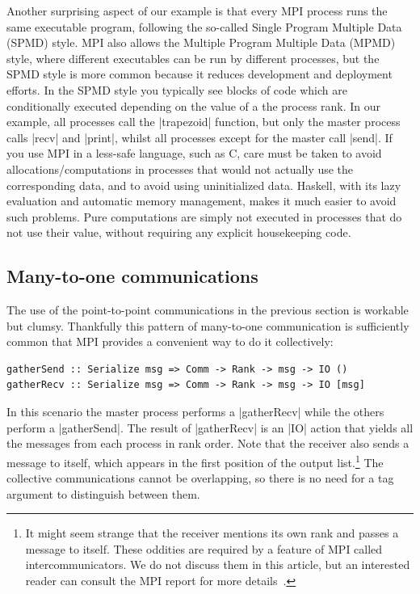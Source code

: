 \documentclass{tmr}
\begin{document}
Another surprising aspect of our example is that every MPI process
runs the same executable program, following the so-called
Single Program Multiple Data (SPMD) style. MPI also allows
the Multiple Program Multiple Data (MPMD) style, where
different executables can be run by different processes, but the SPMD
style is more common because it reduces development and deployment efforts.
In the SPMD style you typically see blocks of code which are
conditionally executed depending on the value of a the process rank.
In our example, all processes call the |trapezoid| function, but
only the master process calls |recv| and |print|, whilst
all processes except for the master call |send|.
If you use MPI in a less-safe language, such as C, care must
be taken to avoid allocations/computations in processes that would not
actually use the corresponding data, and to avoid using
uninitialized data. Haskell, with its lazy evaluation and automatic
memory management, makes it much easier to avoid such problems.
Pure computations are simply not executed in processes that do not use their
value, without requiring any explicit housekeeping code.

\subsection{Many-to-one communications}

The use of the point-to-point communications in the previous section
is workable but clumsy. Thankfully this pattern of many-to-one
communication is sufficiently common that MPI provides a
convenient way to do it collectively:
\begin{Verbatim}
gatherSend :: Serialize msg => Comm -> Rank -> msg -> IO ()
gatherRecv :: Serialize msg => Comm -> Rank -> msg -> IO [msg]
\end{Verbatim}
In this scenario the master process performs a
|gatherRecv| while the others perform a |gatherSend|.
The result of |gatherRecv| is an |IO| action that yields all
the messages from each process in rank order. Note that
the receiver also sends a message to itself, which appears in
the first position of the output list.\footnote{It might seem
strange that the receiver mentions its own rank and passes a message to itself.
These oddities are required by a feature of
MPI called intercommunicators. We do not discuss them in this
article, but an interested reader can consult the MPI report
for more details~\cite{mpi-report}.} The collective communications
cannot be overlapping, so there is no need for a tag argument to
distinguish between them.
\end{document}
